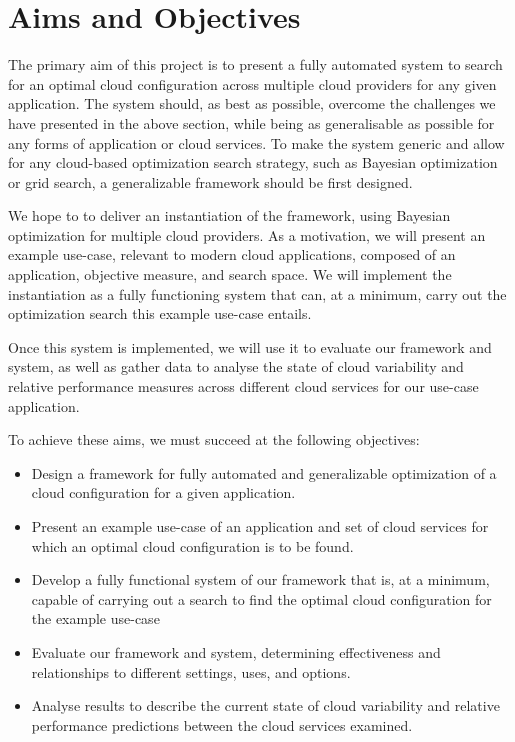 \documentclass{report}
\begin{document}
\section{Aims and Objectives}
The primary aim of this project is to present a fully automated system to search for an optimal cloud configuration across multiple cloud providers for any given application. The system should, as best as possible, overcome the challenges we have presented in the above section, while being as generalisable as possible for any forms of application or cloud services. To make the system generic and allow for any cloud-based optimization search strategy, such as Bayesian optimization or grid search, a generalizable framework should be first designed.

We hope to to deliver an instantiation of the framework, using Bayesian optimization for multiple cloud providers. As a motivation, we will present an example use-case, relevant to modern cloud applications, composed of an application, objective measure, and search space. We will implement the instantiation as a fully functioning system that can, at a minimum, carry out the optimization search this example use-case entails.

Once this system is implemented, we will use it to evaluate our framework and system, as well as gather data to analyse the state of cloud variability and relative performance measures across different cloud services for our use-case application.  

To achieve these aims, we must succeed at the following objectives:
\begin{itemize}
\item Design a framework for fully automated and generalizable optimization of a cloud configuration for a given application.
\item Present an example use-case of an application and set of cloud services for which an optimal cloud configuration is to be found.
\item Develop a fully functional system of our framework that is, at a minimum, capable of carrying out a search to find the optimal cloud configuration for the example use-case
\item Evaluate our framework and system, determining effectiveness and relationships to different settings, uses, and options.
\item Analyse results to describe the current state of cloud variability and relative performance predictions between the cloud services examined.
\end{itemize}
\end{document}
